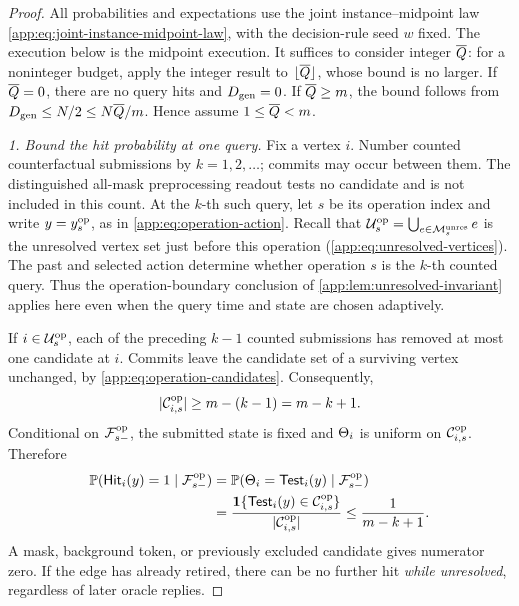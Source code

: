 \begin{proof}
All probabilities and expectations use the joint instance--midpoint law
\eqref{app:eq:joint-instance-midpoint-law}, with the decision-rule seed
\(w\) fixed. The execution below is the midpoint execution.
It suffices to consider integer \(\QueryBudget{}\): for a noninteger
budget, apply the integer result to \(\lfloor\QueryBudget{}\rfloor\),
whose bound is no larger.
If \(\QueryBudget{}=0\), there are no query hits and
\(\GenieDeletions=0\). If \(\QueryBudget{}\ge\HardBankSize\), the bound
follows from \(\GenieDeletions\le N/2\le N\QueryBudget{}/\HardBankSize\).
Hence assume \(1\le\QueryBudget{}<\HardBankSize\).

\emph{1. Bound the hit probability at one query.}
Fix a vertex \(i\). Number counted counterfactual submissions by
\(k=1,2,\ldots\); commits may occur between them.
The distinguished all-mask preprocessing readout tests no candidate
and is not included in this count.
At the \(k\)-th such query, let \(s\) be its operation index and write
\(y=\OpSubmittedState{s}\), as in \cref{app:eq:operation-action}.
Recall that
\(\OpUnresolvedVertices{s}=\bigcup_{e\in\OpUnresolvedMatching{s}}e\)
is the unresolved vertex set just before this operation
(\cref{app:eq:unresolved-vertices}).
The past and selected action determine whether operation \(s\) is
the \(k\)-th counted query. Thus the operation-boundary conclusion of
\cref{app:lem:unresolved-invariant} applies here even when the query
time and state are chosen adaptively.

If \(i\in\OpUnresolvedVertices{s}\), each of the preceding \(k-1\)
counted submissions has removed at most one candidate at \(i\).
Commits leave the candidate set of a surviving vertex unchanged, by
\cref{app:eq:operation-candidates}. Consequently,
\[
 |\OpRemainingTriggers{i}{s}|
 \ge \HardBankSize-(k-1)=\HardBankSize-k+1.
\]
Conditional on \(\OpAnalyticField{s}\), the submitted state is fixed
and \(\TriggerIndex{i}\) is uniform on
\(\OpRemainingTriggers{i}{s}\). Therefore
\begin{align}
 \mathbb P(\HardHit{y}{i}=1\mid\OpAnalyticField{s})
 &=\mathbb P(\TriggerIndex{i}=\HardTest{y}{i}
                  \mid\OpAnalyticField{s})\notag\\
 &=\frac{\mathbf 1\{\HardTest{y}{i}\in\OpRemainingTriggers{i}{s}\}}
         {|\OpRemainingTriggers{i}{s}|}
 \le\frac1{\HardBankSize-k+1}.
 \label{app:eq:query-conditional-hit-bound}
\end{align}
A mask, background token, or previously excluded candidate gives numerator
zero. If the edge has already retired, there can be no further hit
\emph{while unresolved}, regardless of later oracle replies.


\end{proof}
